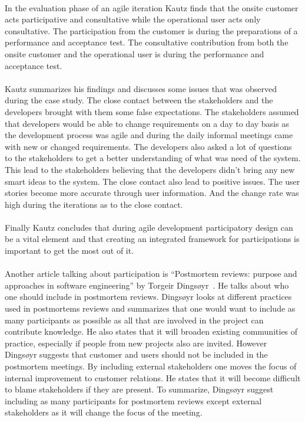\documentclass{article}
\begin{document}
\paragraph{} In the evaluation phase of an agile iteration Kautz finds that the onsite customer acts participative and consultative while the operational user acts only consultative. The participation from the customer is during the preparations of a performance and acceptance test. The consultative contribution from both the onsite customer and the operational user is during the performance and acceptance test. 

\paragraph{} Kautz summarizes his findings and discusses some issues that was observed during the case study. The close contact between the stakeholders and the developers brought with them some false expectations. The stakeholders assumed that developers would be able to change requirements on a day to day basis as the development process was agile and during the daily informal meetings came with new or changed requirements. The developers also asked a lot of questions to the stakeholders to get a better understanding of what was need of the system. This lead to the stakeholders believing that the developers didn't bring any new smart ideas to the system. The close contact also lead to positive issues. The user stories become more accurate through user information. And the change rate was high during the iterations as to the close contact. 

\paragraph{} Finally Kautz concludes that during agile development participatory design can be a vital element and that creating an integrated framework for participations is important to get the most out of it. 

\paragraph{} Another article talking about participation is ``Postmortem reviews: purpose and approaches in software engineering'' by Torgeir Dingsøyr~\cite{Dingsoyr}. He talks about who one should include in postmortem reviews. Dingsøyr looks at different practices used in postmortems reviews and summarizes that one would want to include as many participants as possible as all that are involved in the project can contribute knowledge. He also states that it will broaden existing communities of practice, especially if people from new projects also are invited. However Dingsøyr suggests that customer and users should not be included in the postmortem meetings. By including external stakeholders one moves the focus of internal improvement to customer relations. He states that it will become difficult to blame stakeholders if they are present. To summarize, Dingsøyr suggest including as many participants for postmortem reviews except external stakeholders as it will change the focus of the meeting. 
\end{document}
